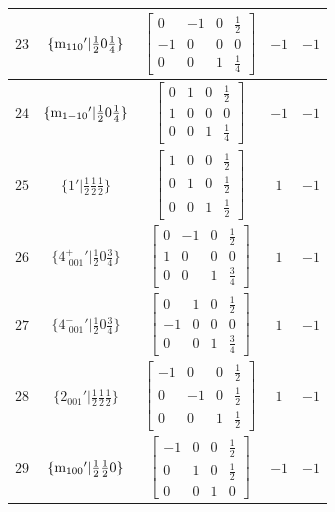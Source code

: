 \documentclass[fleqn,8pt]{jsarticle}
\begin{document}
\begin{longtable}{ccccc}
$ 23 $ & $ \{{\rm m}_{110}{}'|\frac{1}{2} 0 \frac{1}{4}\} $ & $ \begin{bmatrix} 0 & -1 & 0 & \frac{1}{2} \\ -1 & 0 & 0 & 0 \\ 0 & 0 & 1 & \frac{1}{4} \end{bmatrix} $ & $ -1 $ & $ -1 $ \\ \hline
$ 24 $ & $ \{{\rm m}_{1-10}{}'|\frac{1}{2} 0 \frac{1}{4}\} $ & $ \begin{bmatrix} 0 & 1 & 0 & \frac{1}{2} \\ 1 & 0 & 0 & 0 \\ 0 & 0 & 1 & \frac{1}{4} \end{bmatrix} $ & $ -1 $ & $ -1 $ \\ \hline
$ 25 $ & $ \{1{}'|\frac{1}{2} \frac{1}{2} \frac{1}{2}\} $ & $ \begin{bmatrix} 1 & 0 & 0 & \frac{1}{2} \\ 0 & 1 & 0 & \frac{1}{2} \\ 0 & 0 & 1 & \frac{1}{2} \end{bmatrix} $ & $ 1 $ & $ -1 $ \\ \hline
$ 26 $ & $ \{4^{+}_{\,\,001}{}'|\frac{1}{2} 0 \frac{3}{4}\} $ & $ \begin{bmatrix} 0 & -1 & 0 & \frac{1}{2} \\ 1 & 0 & 0 & 0 \\ 0 & 0 & 1 & \frac{3}{4} \end{bmatrix} $ & $ 1 $ & $ -1 $ \\ \hline
$ 27 $ & $ \{4^{-}_{\,\,001}{}'|\frac{1}{2} 0 \frac{3}{4}\} $ & $ \begin{bmatrix} 0 & 1 & 0 & \frac{1}{2} \\ -1 & 0 & 0 & 0 \\ 0 & 0 & 1 & \frac{3}{4} \end{bmatrix} $ & $ 1 $ & $ -1 $ \\ \hline
$ 28 $ & $ \{2{}_{001}{}'|\frac{1}{2} \frac{1}{2} \frac{1}{2}\} $ & $ \begin{bmatrix} -1 & 0 & 0 & \frac{1}{2} \\ 0 & -1 & 0 & \frac{1}{2} \\ 0 & 0 & 1 & \frac{1}{2} \end{bmatrix} $ & $ 1 $ & $ -1 $ \\ \hline
$ 29 $ & $ \{{\rm m}_{100}{}'|\frac{1}{2} \frac{1}{2} 0\} $ & $ \begin{bmatrix} -1 & 0 & 0 & \frac{1}{2} \\ 0 & 1 & 0 & \frac{1}{2} \\ 0 & 0 & 1 & 0 \end{bmatrix} $ & $ -1 $ & $ -1 $ \\ \hline

\end{longtable}
\end{document}
